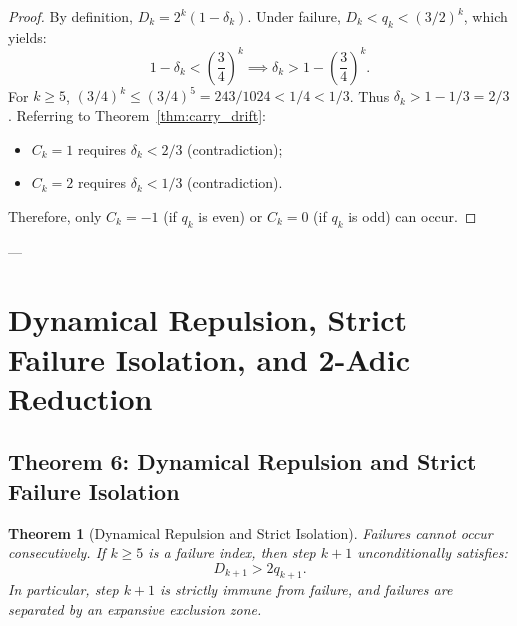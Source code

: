 \documentclass[11pt,reqno]{amsart}
\newtheorem{theorem}{Theorem}[section]
\theoremstyle{definition}
\numberwithin{equation}{section}
\begin{document}
\begin{proof}
By definition, $D_k = 2^k(1 - \delta_k)$. Under failure, $D_k < q_k < (3/2)^k$, which yields:
\[
1 - \delta_k < \left(\frac{3}{4}\right)^k \implies \delta_k > 1 - \left(\frac{3}{4}\right)^k.
\]
For $k \ge 5$, $(3/4)^k \le (3/4)^5 = 243/1024 < 1/4 < 1/3$. Thus $\delta_k > 1 - 1/3 = 2/3$.
Referring to Theorem~\ref{thm:carry_drift}:
\begin{itemize}
    \item $C_k = 1$ requires $\delta_k < 2/3$ (contradiction);
    \item $C_k = 2$ requires $\delta_k < 1/3$ (contradiction).
\end{itemize}
Therefore, only $C_k = -1$ (if $q_k$ is even) or $C_k = 0$ (if $q_k$ is odd) can occur.
\end{proof}

---

\section{Dynamical Repulsion, Strict Failure Isolation, and 2-Adic Reduction}

\subsection{Theorem 6: Dynamical Repulsion and Strict Failure Isolation}

\begin{theorem}[Dynamical Repulsion and Strict Isolation]\label{thm:repulsion}
Failures cannot occur consecutively. If $k \ge 5$ is a failure index, then step $k + 1$ unconditionally satisfies:
\begin{equation}
D_{k+1} > 2 q_{k+1}.
\end{equation}
In particular, step $k+1$ is strictly immune from failure, and failures are separated by an expansive exclusion zone.
\end{theorem}
\end{document}
